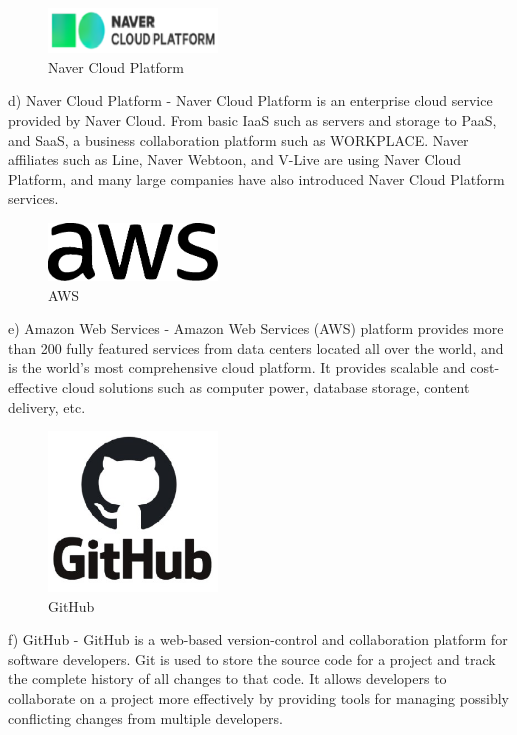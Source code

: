 \documentclass[conference]{IEEEtran}
\begin{document}
\begin{figure}[!htbp]
\centering
    \includegraphics[width =4.5cm]{ncp.eps}
    \hfil
\caption{Naver Cloud Platform}
\end{figure}

d)	Naver Cloud Platform
-	Naver Cloud Platform is an enterprise cloud service provided by Naver Cloud. From basic IaaS such as servers and storage to PaaS, and SaaS, a business collaboration platform such as WORKPLACE. Naver affiliates such as Line, Naver Webtoon, and V-Live are using Naver Cloud Platform, and many large companies have also introduced Naver Cloud Platform services.

\begin{figure}[!htbp]
\centering
    \includegraphics[width =4.5cm]{AWS.eps}
    \hfil
\caption{AWS}
\end{figure}
e)	Amazon Web Services
-	Amazon Web Services (AWS) platform provides more than 200 fully featured services from data centers located all over the world, and is the world's most comprehensive cloud platform. It provides scalable and cost-effective cloud solutions such as computer power, database storage, content delivery, etc. 

\begin{figure}[!htbp]
\centering
    \includegraphics[width =4.5cm]{github.eps}
    \hfil
\caption{GitHub}
\end{figure}

f)	GitHub
-	GitHub is a web-based version-control and collaboration platform for software developers. Git is used to store the source code for a project and track the complete history of all changes to that code. It allows developers to collaborate on a project more effectively by providing tools for managing possibly conflicting changes from multiple developers.
\end{document}
